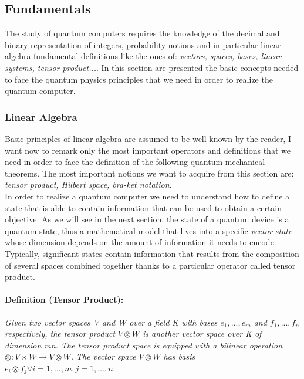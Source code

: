 \documentclass[english]{article}
\begin{document}
		\subsection{Fundamentals}
		\label{sec:fundamentals}
			The study of quantum computers requires the knowledge of the decimal and binary representation of integers, probability notions and in particular linear algebra fundamental definitions like the ones of: \emph{vectors, spaces, bases, linear systems, tensor product...}. In this section are presented the basic concepts needed to face the quantum physics principles that we need in order to realize the quantum computer. 
			
			\subsubsection{Linear Algebra}
			\label{sec:linearAlgebra}
			Basic principles of linear algebra are assumed to be well known by the reader, I want now to remark only the most important operators and definitions that we need in order to face the definition of the following quantum mechanical theorems. The most important notions we want to acquire from this section are: \emph{tensor product, Hilbert space, bra-ket notation}.\\
			
			In order to realize a quantum computer we need to understand how to define a state that is able to contain information that can be used to obtain a certain objective. As we will see in the next section, the state of a quantum device is a quantum state, thus a mathematical model that lives into a specific \emph{vector state} whose dimension depends on the amount of information it needs to encode. Typically, significant states contain information that results from the composition of several spaces combined together thanks to a particular operator called tensor product.
			
			\paragraph{Definition (Tensor Product):} \emph{Given two vector spaces V and W over a field K with bases $e_1,..., e_m$ and
$f_1,..., f_n$ respectively, the tensor product $V \otimes W$ is another vector space over K of dimension
mn. The tensor product space is equipped with a bilinear operation $\otimes : V \times W \rightarrow V \otimes W$. The
vector space $V \otimes W$ has basis $e_i \otimes f_j \forall i = 1,...,m, j = 1,...,n$}. \\
			
\end{document}
